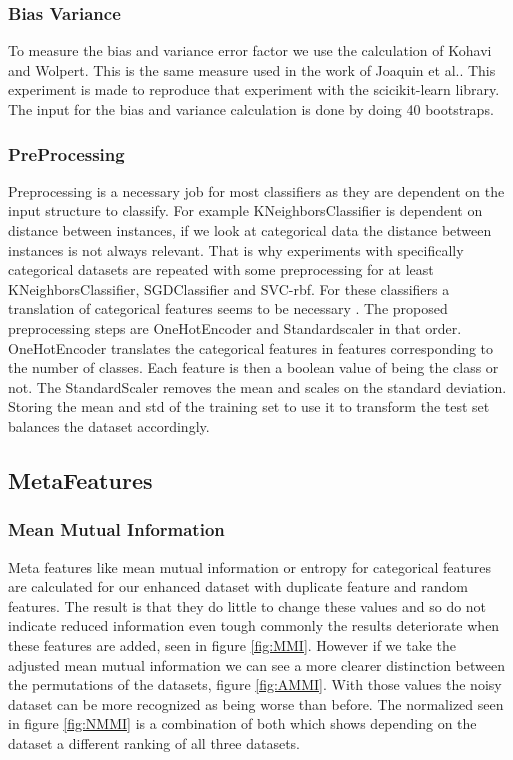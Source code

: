 \documentclass[a4paper,10pt]{article}
\begin{document}
\subsubsection{Bias Variance}
To measure the bias and variance error factor we use the calculation of Kohavi and Wolpert\cite{BiasCalc}. This is the same measure used in the work of Joaquin et al.\cite{Bias-var}. This experiment is made to reproduce that experiment with the scicikit-learn library. The input for the bias and variance calculation is done by doing 40 bootstraps. 

\subsubsection{PreProcessing}
Preprocessing is a necessary job for most classifiers as they are dependent on the input structure to classify. For example KNeighborsClassifier is dependent on distance between instances, if we look at categorical data the distance between instances is not always relevant. That is why experiments with specifically categorical datasets are repeated with some preprocessing for at least KNeighborsClassifier, SGDClassifier and SVC-rbf. For these classifiers a translation of categorical features seems to be necessary \cite{KNN-Sym}\cite{SVM-sym}. The proposed preprocessing steps are OneHotEncoder and Standardscaler in that order. OneHotEncoder translates the categorical features in features corresponding to the number of classes. Each feature is then a boolean value of being the class or not. The StandardScaler removes the mean and scales on the standard deviation. Storing the mean and std of the training set to use it to transform the test set balances the dataset accordingly. 

\subsection{MetaFeatures}

\subsubsection{Mean Mutual Information}\label{chapter311}
Meta features like mean mutual information or entropy for categorical features are calculated for our enhanced dataset with duplicate feature and random features. The result is that they do little to change these values and so do not indicate reduced information even tough commonly the results deteriorate when these features are added, seen in figure \ref{fig:MMI}. However if we take the adjusted mean mutual information we can see a more clearer distinction between the permutations of the datasets, figure \ref{fig:AMMI}. With those values the noisy dataset can be more recognized as being worse than before. The normalized seen in figure \ref{fig:NMMI}  is a combination of both which shows depending on the dataset a different ranking of all three datasets.
\end{document}
